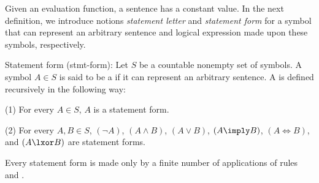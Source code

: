 Given an evaluation function, a sentence has a constant value. In the next
definition, we introduce notions {\it statement letter} and {\it statement
form} for a symbol that can represent an arbitrary sentence and logical
expression made upon these symbols, respectively.

 Statement form (stmt-form):
  Let $S$ be a countable nonempty set of symbols. A symbol $A \in S$ is said to
  be a  if it can represent an arbitrary sentence. A
   is defined recursively in the following way:
    \item(1) For every $A \in S$, $A$ is a statement form.
    \item(2) For every $A, B \in S$, $(\lnot A)$, $(A\land B)$, $(A\lor B)$,
      $(A\imply B)$, $(A\iff B)$, and $(A\lxor B)$ are statement forms.
    \item Every statement form is made only by a finite number of applications
      of rules  and .
  \quit
\quit

\docend
